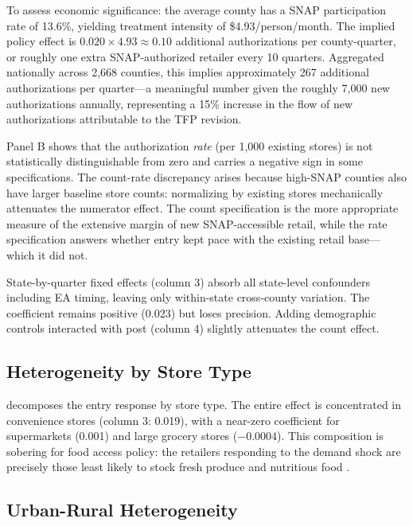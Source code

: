 \documentclass[12pt]{article}
\begin{document}
To assess economic significance: the average county has a SNAP participation rate of 13.6\%, yielding treatment intensity of \$4.93/person/month. The implied policy effect is $0.020 \times 4.93 \approx 0.10$ additional authorizations per county-quarter, or roughly one extra SNAP-authorized retailer every 10 quarters. Aggregated nationally across 2,668 counties, this implies approximately 267 additional authorizations per quarter---a meaningful number given the roughly 7,000 new authorizations annually, representing a 15\% increase in the flow of new authorizations attributable to the TFP revision.

Panel B shows that the authorization \textit{rate} (per 1,000 existing stores) is not statistically distinguishable from zero and carries a negative sign in some specifications. The count-rate discrepancy arises because high-SNAP counties also have larger baseline store counts: normalizing by existing stores mechanically attenuates the numerator effect. The count specification is the more appropriate measure of the extensive margin of new SNAP-accessible retail, while the rate specification answers whether entry kept pace with the existing retail base---which it did not.

State-by-quarter fixed effects (column 3) absorb all state-level confounders including EA timing, leaving only within-state cross-county variation. The coefficient remains positive (0.023) but loses precision. Adding demographic controls interacted with post (column 4) slightly attenuates the count effect.

\subsection{Heterogeneity by Store Type}



 decomposes the entry response by store type. The entire effect is concentrated in convenience stores (column 3: 0.019), with a near-zero coefficient for supermarkets (0.001) and large grocery stores ($-0.0004$). This composition is sobering for food access policy: the retailers responding to the demand shock are precisely those least likely to stock fresh produce and nutritious food \citep{allcott2019, ver2018}.

\subsection{Urban-Rural Heterogeneity}
\end{document}
